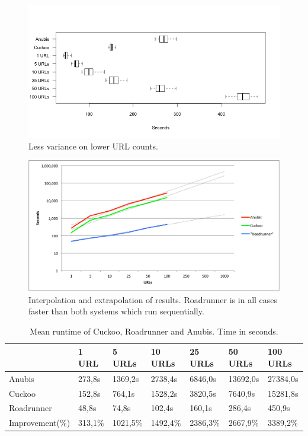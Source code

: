 \begin{figure}[h]
    \centering
    \centerline{\includegraphics[width=17cm]{Images/chart-box.png}}
    \caption{Less variance on lower URL counts.}
    \label{fig:chart-box}
\end{figure}

\begin{figure}[h]
    \centering
    \centerline{\includegraphics[width=17cm]{Images/chart-trend}}
    \caption{Interpolation and extrapolation of results. Roadrunner is in all cases faster than both systems which run sequentially.}
    \label{fig:chart-trend}
\end{figure}

\begin{table}[h]
\begin{tabular}{@{}lllllll@{}}
\toprule
                                  & 1 URL    & 5 URLs   & 10 URLs      & 25 URLs      & 50 URLs     & 100 URLs \\ \midrule
Anubis       & 273,8s   & 1369,2s   & 2738,4s      & 6846,0s      & 13692,0s     & 27384,0s \\                                  
Cuckoo       & 152,8s   & 764,1s   & 1528,2s      & 3820,5s      & 7640,9s     & 15281,8s \\
Roadrunner& 48,8s    & 74,8s    & 102,4s       & 160,1s       & 286,4s      & 450,9s   \\
Improvement(\%)                   & 313,1\%  & 1021,5\% & 1492,4\%     & 2386,3\%     & 2667,9\%    & 3389,2\% \\ \bottomrule
\end{tabular}
\caption{Mean runtime of Cuckoo, Roadrunner and Anubis. Time in seconds.}
\label{tbl:results}
\end{table}
